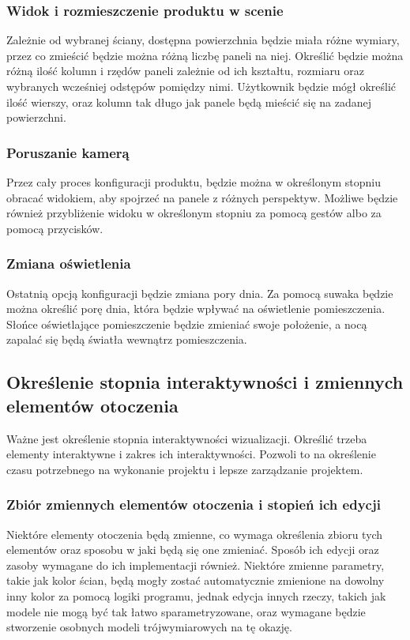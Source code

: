 \documentclass{article} %
\begin{document}
        \subsubsection{Widok i rozmieszczenie produktu w scenie}
        Zależnie od wybranej ściany, dostępna powierzchnia będzie miała różne wymiary, przez co zmieścić będzie można różną liczbę paneli na niej. Określić będzie można różną ilość kolumn i rzędów paneli zależnie od ich kształtu, rozmiaru oraz wybranych wcześniej odstępów pomiędzy nimi. Użytkownik będzie mógł określić ilość wierszy, oraz kolumn tak długo jak panele będą mieścić się na zadanej powierzchni.
        \\
        
        \subsubsection{Poruszanie kamerą}
        Przez cały proces konfiguracji produktu, będzie można w określonym stopniu obracać widokiem, aby spojrzeć na panele z różnych perspektyw. Możliwe będzie również przybliżenie widoku w określonym stopniu za pomocą gestów albo za pomocą przycisków. 
        \\
        
        \subsubsection{Zmiana oświetlenia}
        Ostatnią opcją konfiguracji będzie zmiana pory dnia. Za pomocą suwaka będzie można określić porę dnia, która będzie wpływać na oświetlenie pomieszczenia. Słońce oświetlające pomieszczenie będzie zmieniać swoje położenie, a nocą zapalać się będą światła wewnątrz pomieszczenia.
        \\
    \subsection{Określenie stopnia interaktywności i zmiennych elementów otoczenia}
        Ważne jest określenie stopnia interaktywności wizualizacji. Określić trzeba elementy interaktywne i zakres ich interaktywności. Pozwoli to na określenie czasu potrzebnego na wykonanie projektu i lepsze zarządzanie projektem. 
        \\
        
        \subsubsection{Zbiór zmiennych elementów otoczenia i stopień ich edycji}
        Niektóre elementy otoczenia będą zmienne, co wymaga określenia zbioru tych elementów oraz sposobu w jaki będą się one zmieniać. Sposób ich edycji oraz zasoby wymagane do ich implementacji również. Niektóre zmienne parametry, takie jak kolor ścian, będą mogły zostać automatycznie zmienione na dowolny inny kolor za pomocą logiki programu, jednak edycja innych rzeczy, takich jak modele nie mogą być tak łatwo sparametryzowane, oraz wymagane będzie stworzenie osobnych modeli trójwymiarowych na tę okazję.
        \\
        
\end{document}
